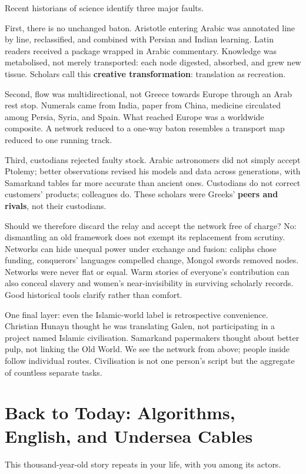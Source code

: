 Recent historians of science identify three major faults.

First, there is no unchanged baton. Aristotle entering Arabic was annotated line by line, reclassified, and combined with Persian and Indian learning. Latin readers received a package wrapped in Arabic commentary. Knowledge was metabolised, not merely transported: each node digested, absorbed, and grew new tissue. Scholars call this \textbf{creative transformation}: translation as recreation.

Second, flow was multidirectional, not Greece towards Europe through an Arab rest stop. Numerals came from India, paper from China, medicine circulated among Persia, Syria, and Spain. What reached Europe was a worldwide composite. A network reduced to a one-way baton resembles a transport map reduced to one running track.

Third, custodians rejected faulty stock. Arabic astronomers did not simply accept Ptolemy; better observations revised his models and data across generations, with Samarkand tables far more accurate than ancient ones. Custodians do not correct customers' products; colleagues do. These scholars were Greeks' \textbf{peers and rivals}, not their custodians.

Should we therefore discard the relay and accept the network free of charge? No: dismantling an old framework does not exempt its replacement from scrutiny. Networks can hide unequal power under exchange and fusion: caliphs chose funding, conquerors' languages compelled change, Mongol swords removed nodes. Networks were never flat or equal. Warm stories of everyone's contribution can also conceal slavery and women's near-invisibility in surviving scholarly records. Good historical tools clarify rather than comfort.

One final layer: even the Islamic-world label is retrospective convenience. Christian Hunayn thought he was translating Galen, not participating in a project named Islamic civilisation. Samarkand papermakers thought about better pulp, not linking the Old World. We see the network from above; people inside follow individual routes. Civilisation is not one person's script but the aggregate of countless separate tasks.

\section[Algorithms, English, and Undersea Cables]{Back to Today: Algorithms, English, and Undersea Cables}
This thousand-year-old story repeats in your life, with you among its actors.

